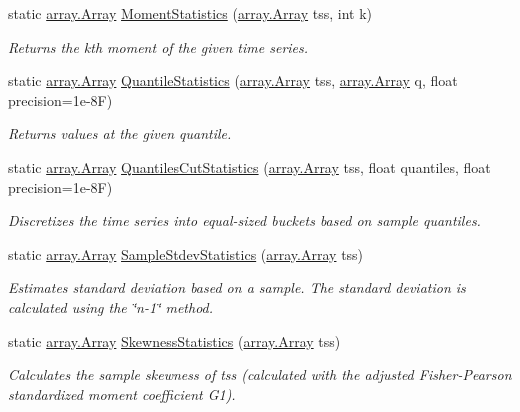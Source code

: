 \begin{DoxyCompactItemize}
static \mbox{\hyperlink{classkhiva_1_1array_1_1_array}{array.\+Array}} \mbox{\hyperlink{classkhiva_1_1statistics_1_1_statistics_a86385983836f53b52640f11dcd4d78b6}{Moment\+Statistics}} (\mbox{\hyperlink{classkhiva_1_1array_1_1_array}{array.\+Array}} tss, int k)
\begin{DoxyCompactList}\small\item\em Returns the kth moment of the given time series. \end{DoxyCompactList}\item 
static \mbox{\hyperlink{classkhiva_1_1array_1_1_array}{array.\+Array}} \mbox{\hyperlink{classkhiva_1_1statistics_1_1_statistics_a2314281b0dacaec606e6e469e7e414b6}{Quantile\+Statistics}} (\mbox{\hyperlink{classkhiva_1_1array_1_1_array}{array.\+Array}} tss, \mbox{\hyperlink{classkhiva_1_1array_1_1_array}{array.\+Array}} q, float precision=1e-\/8\+F)
\begin{DoxyCompactList}\small\item\em Returns values at the given quantile. \end{DoxyCompactList}\item 
static \mbox{\hyperlink{classkhiva_1_1array_1_1_array}{array.\+Array}} \mbox{\hyperlink{classkhiva_1_1statistics_1_1_statistics_a6cdf0ca7e81e5564d91f9b630f18e43d}{Quantiles\+Cut\+Statistics}} (\mbox{\hyperlink{classkhiva_1_1array_1_1_array}{array.\+Array}} tss, float quantiles, float precision=1e-\/8\+F)
\begin{DoxyCompactList}\small\item\em Discretizes the time series into equal-\/sized buckets based on sample quantiles. \end{DoxyCompactList}\item 
static \mbox{\hyperlink{classkhiva_1_1array_1_1_array}{array.\+Array}} \mbox{\hyperlink{classkhiva_1_1statistics_1_1_statistics_a65c5170ee0777cf6a38bd05a3daf2ab3}{Sample\+Stdev\+Statistics}} (\mbox{\hyperlink{classkhiva_1_1array_1_1_array}{array.\+Array}} tss)
\begin{DoxyCompactList}\small\item\em Estimates standard deviation based on a sample. The standard deviation is calculated using the \char`\"{}n-\/1\char`\"{} method. \end{DoxyCompactList}\item 
static \mbox{\hyperlink{classkhiva_1_1array_1_1_array}{array.\+Array}} \mbox{\hyperlink{classkhiva_1_1statistics_1_1_statistics_a2b1bc2a41eff99f2900e7cca95b28fbb}{Skewness\+Statistics}} (\mbox{\hyperlink{classkhiva_1_1array_1_1_array}{array.\+Array}} tss)
\begin{DoxyCompactList}\small\item\em Calculates the sample skewness of tss (calculated with the adjusted Fisher-\/\+Pearson standardized moment coefficient G1). \end{DoxyCompactList}\end{DoxyCompactItemize}


